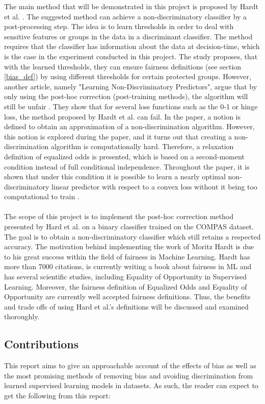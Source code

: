 \documentclass[11pt, fleqn, titlepage]{article}
\begin{document}
	\noindent The main method that will be demonstrated in this project is proposed by Hardt et al. \cite{equal_of_oppor}. The suggested method can achieve a non-discriminatory classifier by a post-processing step. The idea is to learn thresholds in order to deal with sensitive features or groups in the data in a discriminant classifier. The method requires that the classifier has information about the data at decision-time, which is the case in the experiment conducted in this project. The study proposes, that with the learned thresholds, they can ensure fairness definitions (see section \ref{bias_def}) by using different thresholds for certain protected groups. However, another article, namely "Learning Non-Discriminatory Predictors", argue that by only using the post-hoc correction (post-training methods), the algorithm will still be unfair \cite{b_woodworth}. They show that for several loss functions such as the 0-1 or hinge loss, the method proposed by Hardt et al. \cite{equal_of_oppor} can fail. In the paper, a notion is defined to obtain an approximation of a non-discrimination algorithm. However, this notion is explored during the paper, and it turns out that creating a non-discrimination algorithm is computationally hard. Therefore, a relaxation definition of equalized odds is presented, which is based on a second-moment condition instead of full conditional independence. Throughout the paper, it is shown that under this condition it is possible to learn a nearly optimal non-discriminatory linear predictor with respect to a convex loss without it being too computational to train \cite{b_woodworth}.\\\\
	The scope of this project is to implement the post-hoc correction method presented by Hard et al. on a binary classifier trained on the COMPAS dataset. The goal is to obtain a non-discriminatory classifier which still retains a respected accuracy. The motivation behind implementing the work of Moritz Hardt is due to his great success within the field of fairness in Machine Learning. Hardt has more than 7000 citations, is currently writing a book about fairness in ML and has several scientific studies, including Equality of Opportunity in Supervised Learning. Moreover, the fairness definition of Equalized Odds and Equality of Opportunity are currently well accepted fairness definitions. Thus, the benefits and trade offs of using Hard et al.'s definitions will be discussed and examined thoroughly.
	
	\subsection{Contributions}
	This report aims to give an approachable account of the effects of bias as well as the most promising methods of removing bias and avoiding discrimination from learned supervised learning models in datasets. As such, the reader can expect to get the following from this report:
	
\end{document}
